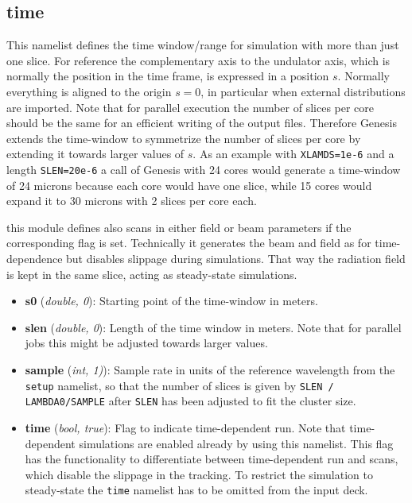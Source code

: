 \documentclass[12pt]{book}
\begin{document}
\subsection{\sf time}

This namelist defines the time window/range  for simulation with more than just one slice. For reference the complementary axis to the undulator axis, which is normally the position in the time frame, is expressed in a position $s$. Normally everything is aligned to the origin $s=0$, in particular when external distributions are imported. Note that for parallel execution the number of slices per core should be the same for an efficient writing of the output files. Therefore Genesis extends the time-window to symmetrize the number of slices per core by extending it towards larger values of $s$. As an example with {\tt XLAMDS=1e-6} and a length {\tt SLEN=20e-6} a call of Genesis with 24 cores would generate a time-window of 24 microns because each core would have one slice, while 15 cores would expand it to 30 microns with 2 slices per core each.

this module defines also scans in either field or beam parameters if the corresponding flag is set. Technically it generates the beam and field as for time-dependence but disables slippage during simulations. That way the radiation field is kept in the same slice, acting as steady-state simulations.

\begin{itemize}
\item {\bf s0} ({\it double, 0}): Starting point of the time-window in meters.
\item {\bf slen} ({\it double, 0}): Length of the time window in meters. Note that for parallel jobs this might be adjusted towards larger values.
\item {\bf sample} ({\it int, 1)}): Sample rate in units of the reference wavelength from the {\tt setup} namelist, so that the number of slices is given by {\tt SLEN / LAMBDA0/SAMPLE} after {\tt SLEN} has been adjusted to fit the cluster size.
\item{\bf time} ({\it bool, true}): Flag to indicate time-dependent run. Note that time-dependent simulations are enabled already by using this namelist. This flag has the functionality to differentiate between time-dependent run and scans, which disable the slippage in the tracking. To restrict the simulation to steady-state the {\tt time} namelist has to be omitted from the input deck.
\end{itemize}
\end{document}
